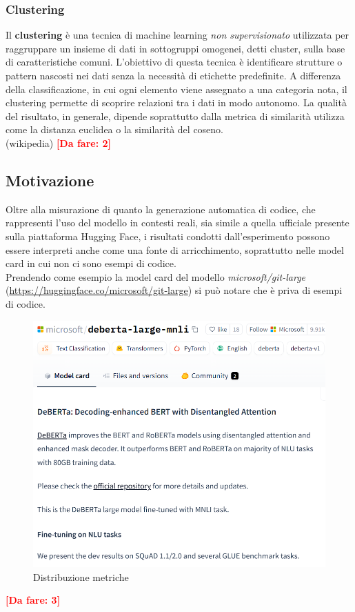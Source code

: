 \documentclass{article}
\newcommand{\dafare}[1]{\textbf{\textcolor{red}{[Da fare: #1]}}}
\begin{document}
\subsubsection{Clustering}
Il \textbf{clustering} è una tecnica di machine learning \textit{non supervisionato} utilizzata per raggruppare un insieme di dati in sottogruppi omogenei, detti cluster, sulla base di caratteristiche comuni. L'obiettivo di questa tecnica è identificare strutture o pattern nascosti nei dati senza la necessità di etichette predefinite. A differenza della classificazione, in cui ogni elemento viene assegnato a una categoria nota, il clustering permette di scoprire relazioni tra i dati in modo autonomo. La qualità del risultato, in generale, dipende soprattutto dalla metrica di similarità utilizza come la distanza euclidea o la similarità del coseno.\\ (wikipedia)
\dafare{2}

\subsection{Motivazione} \label{motivation}
Oltre alla misurazione di quanto la generazione automatica di codice, che rappresenti l'uso del modello in contesti reali, sia simile a quella ufficiale presente sulla piattaforma Hugging Face, i risultati condotti dall'esperimento possono essere interpreti anche come una fonte di arricchimento, soprattutto nelle model card in cui non ci sono esempi di codice.\\
Prendendo come esempio la model card del modello \textit{microsoft/git-large} (\url{https://huggingface.co/microsoft/git-large}) si può notare che è priva di esempi di codice.
\begin{figure}[htbp]
    \centering
    \includegraphics[width=\textwidth]{images/model_card_senza_codice.png}
    \caption{Distribuzione metriche}
    \label{fig:motivazione}
\end{figure}
\dafare{3}
\end{document}
